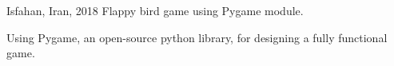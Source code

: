 \begin{cventries}
\cventry
    {Isfahan, Iran, 2018} %
    {Flappy bird game using Pygame module.} %
    {} %
    {} %
    {
      \begin{cvitems} %
        \item {Using Pygame, an open-source python library, for designing a fully functional game.}
      \end{cvitems}
    }

\end{cventries}
